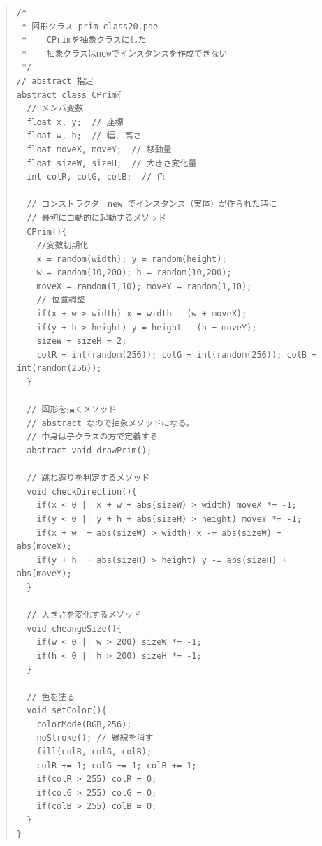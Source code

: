 \documentclass[uplatex,a4j,11pt]{jsarticle}
\renewcommand{\baselinestretch}{1.08}
\begin{document}
    \begin{quote}
	\begin{minipage}{\linewidth}
	 \begin{shadebox}
      \def\baselinestretch{.8}\selectfont
      \small
      \begin{verbatim}
/*
 * 図形クラス prim_class20.pde
 *    CPrimを抽象クラスにした
 *    抽象クラスはnewでインスタンスを作成できない
 */
// abstract 指定
abstract class CPrim{
  // メンバ変数
  float x, y;  // 座標
  float w, h;  // 幅, 高さ  
  float moveX, moveY;  // 移動量
  float sizeW, sizeH;  // 大きさ変化量
  int colR, colG, colB;  // 色

  // コンストラクタ　new でインスタンス（実体）が作られた時に
  // 最初に自動的に起動するメソッド
  CPrim(){
    //変数初期化
    x = random(width); y = random(height);
    w = random(10,200); h = random(10,200);
    moveX = random(1,10); moveY = random(1,10);
    // 位置調整
    if(x + w > width) x = width - (w + moveX);
    if(y + h > height) y = height - (h + moveY);
    sizeW = sizeH = 2;
    colR = int(random(256)); colG = int(random(256)); colB = int(random(256));
  }

  // 図形を描くメソッド
  // abstract なので抽象メソッドになる。
  // 中身は子クラスの方で定義する
  abstract void drawPrim();

  // 跳ね返りを判定するメソッド
  void checkDirection(){
    if(x < 0 || x + w + abs(sizeW) > width) moveX *= -1;
    if(y < 0 || y + h + abs(sizeH) > height) moveY *= -1;
    if(x + w  + abs(sizeW) > width) x -= abs(sizeW) + abs(moveX);
    if(y + h  + abs(sizeH) > height) y -= abs(sizeH) + abs(moveY);
  }

  // 大きさを変化するメソッド
  void cheangeSize(){
    if(w < 0 || w > 200) sizeW *= -1;
    if(h < 0 || h > 200) sizeH *= -1;
  }

  // 色を塗る
  void setColor(){
    colorMode(RGB,256);
    noStroke(); // 縁線を消す
    fill(colR, colG, colB);
    colR += 1; colG += 1; colB += 1;
    if(colR > 255) colR = 0;
    if(colG > 255) colG = 0;
    if(colB > 255) colB = 0;
  }
}
      \end{verbatim}
     \end{shadebox}
    \end{minipage}
    \end{quote}
\end{document}
